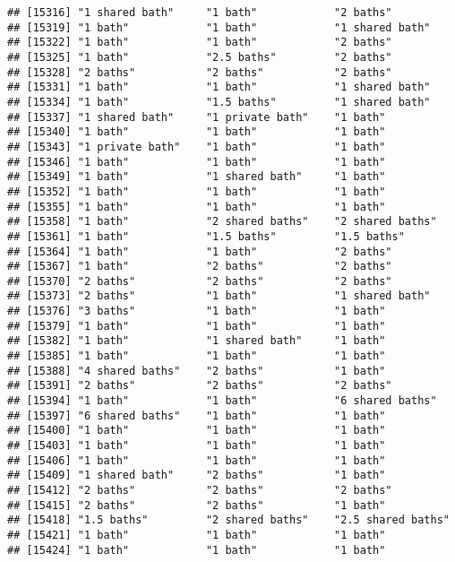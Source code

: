 \documentclass[
]{article}
\begin{document}
\begin{verbatim}
## [15316] "1 shared bath"     "1 bath"            "2 baths"          
## [15319] "1 bath"            "1 bath"            "1 shared bath"    
## [15322] "1 bath"            "1 bath"            "2 baths"          
## [15325] "1 bath"            "2.5 baths"         "2 baths"          
## [15328] "2 baths"           "2 baths"           "2 baths"          
## [15331] "1 bath"            "1 bath"            "1 shared bath"    
## [15334] "1 bath"            "1.5 baths"         "1 shared bath"    
## [15337] "1 shared bath"     "1 private bath"    "1 bath"           
## [15340] "1 bath"            "1 bath"            "1 bath"           
## [15343] "1 private bath"    "1 bath"            "1 bath"           
## [15346] "1 bath"            "1 bath"            "1 bath"           
## [15349] "1 bath"            "1 shared bath"     "1 bath"           
## [15352] "1 bath"            "1 bath"            "1 bath"           
## [15355] "1 bath"            "1 bath"            "1 bath"           
## [15358] "1 bath"            "2 shared baths"    "2 shared baths"   
## [15361] "1 bath"            "1.5 baths"         "1.5 baths"        
## [15364] "1 bath"            "1 bath"            "2 baths"          
## [15367] "1 bath"            "2 baths"           "2 baths"          
## [15370] "2 baths"           "2 baths"           "2 baths"          
## [15373] "2 baths"           "1 bath"            "1 shared bath"    
## [15376] "3 baths"           "1 bath"            "1 bath"           
## [15379] "1 bath"            "1 bath"            "1 bath"           
## [15382] "1 bath"            "1 shared bath"     "1 bath"           
## [15385] "1 bath"            "1 bath"            "1 bath"           
## [15388] "4 shared baths"    "2 baths"           "1 bath"           
## [15391] "2 baths"           "2 baths"           "2 baths"          
## [15394] "1 bath"            "1 bath"            "6 shared baths"   
## [15397] "6 shared baths"    "1 bath"            "1 bath"           
## [15400] "1 bath"            "1 bath"            "1 bath"           
## [15403] "1 bath"            "1 bath"            "1 bath"           
## [15406] "1 bath"            "1 bath"            "1 bath"           
## [15409] "1 shared bath"     "2 baths"           "1 bath"           
## [15412] "2 baths"           "2 baths"           "2 baths"          
## [15415] "2 baths"           "2 baths"           "1 bath"           
## [15418] "1.5 baths"         "2 shared baths"    "2.5 shared baths" 
## [15421] "1 bath"            "1 bath"            "1 bath"           
## [15424] "1 bath"            "1 bath"            "1 bath"           

\end{verbatim}
\end{document}
